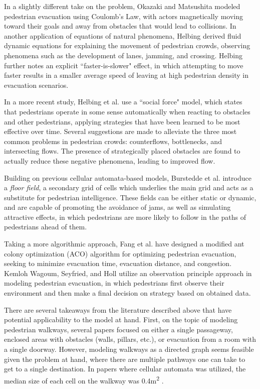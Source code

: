 \documentclass[12pt]{article}
\begin{document}
In a slightly different take on the problem, Okazaki and Matsushita
\cite{okazaki1993study} modeled pedestrian evacuation using Coulomb's Law, with
actors magnetically moving toward their goals and away from obstacles that would
lead to collisions. In another application of equations of natural phenomena,
Helbing \cite{helbing1998fluid} derived fluid dynamic equations for explaining
the movement of pedestrian crowds, observing phenomena such as the development
of lanes, jamming, and crossing. Helbing \cite{helbing2000simulating} further
notes an explicit ``faster-is-slower" effect, in which attempting to move faster
results in a smaller average speed of leaving at high pedestrian density in
evacuation scenarios.

In a more recent study, Helbing et al. \cite{helbing2005self} use a
``social force" model, which states that pedestrians operate in some sense
automatically when reacting to obstacles and other pedestrians, applying
strategies that have been learned to be most effective over time. Several
suggestions are made to alleviate the three most common problems in pedestrian
crowds: counterflows, bottlenecks, and intersecting flows. The presence of
strategically placed obstacles are found to actually reduce these negative
phenomena, leading to improved flow.

Building on previous cellular automata-based models, Burstedde et al.
\cite{burstedde2001simulation} introduce a \textit{floor field}, a secondary
grid of cells which underlies the main grid and acts as a substitute for
pedestrian intelligence. These fields can be either static or dynamic, and are
capable of promoting the avoidance of jams, as well as simulating attractive
effects, in which pedestrians are more likely to follow in the paths of
pedestrians ahead of them.

Taking a more algorithmic approach, Fang et al. \cite{fang2011hierarchical} have
designed a modified ant colony optimization (ACO) algorithm for optimizing
pedestrian evacuation, seeking to minimize evacuation time, evacuation distance,
and congestion. Kemloh Wagoum, Seyfried, and Holl \cite{kemloh2012modeling}
utilize an observation principle approach in modeling pedestrian evacuation,
in which pedestrians first observe their environment and then make a final
decision on strategy based on obtained data.

There are several takeaways from the literature described above that have
potential applicability to the model at hand. First, on the topic of modeling
pedestrian walkways, several papers focused on either a single passageway,
enclosed areas with obstacles (walls, pillars, etc.), or evacuation from a
room with a single doorway. However, modeling walkways as a directed graph
\cite{fang2011hierarchical} seems feasible given the problem at hand, where
there are multiple pathways one can take to get to a single destination. In
papers where cellular automata was utilized, the median size of each cell on the
walkway was 0.4m\textsuperscript{2}
\cite{blue2001cellular,burstedde2001simulation,weifeng2003simulation}.
\end{document}
